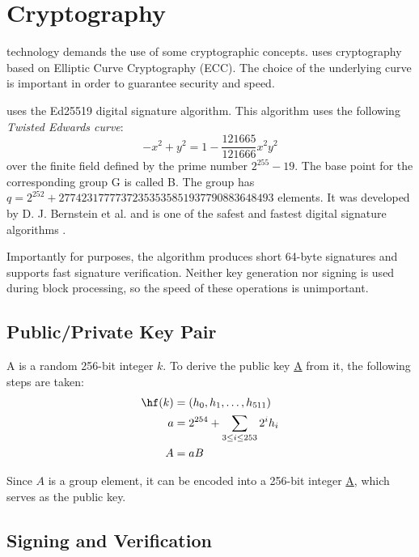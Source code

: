 \section{Cryptography}
\label{sec:cryptography}


 technology demands the use of some cryptographic concepts.
\codenamespace uses cryptography based on Elliptic Curve Cryptography (ECC).
The choice of the underlying curve is important in order to guarantee security and speed.

\codenamespace uses the Ed25519 digital signature algorithm.
This algorithm uses the following \emph{Twisted Edwards curve}:
$$ -x^2 + y^2 = 1 - \frac{121665}{121666} x^2 y^2$$
over the finite field defined by the prime number $2^{255}-19$.
The base point for the corresponding group G is called B.
The group has $q=2^{252} + 27742317777372353535851937790883648493$ elements.
It was developed by D. J. Bernstein et al. and is one of the safest and fastest digital signature algorithms \cite{Bernstein2011}.

Importantly for \codenamespace purposes, the algorithm produces short 64-byte signatures and supports fast signature verification.
Neither key generation nor signing is used during block processing, so the speed of these operations is unimportant.

\subsection{Public/Private Key Pair}

A  is a random 256-bit integer $k$. To derive the public key \underline{A} from it, the following steps are taken:
\begin{align}
	\hf(k) &=(h_0, h_1, \ldots, h_{511}) \\
	a &= 2^{254} + \sum_{3\leq i \leq 253} 2^i h_i \\
	A &= aB
\end{align}

Since $A$ is a group element, it can be encoded into a 256-bit integer \underline{A}, which serves as the public key.

\subsection{Signing and Verification}

